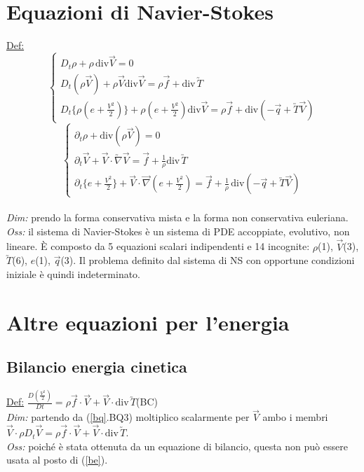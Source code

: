 \documentclass[11pt,a4paper]{report}
\newcommand{\sz}[1]{\scriptsize #1\normalsize}
\begin{document}
	\section{Equazioni di Navier-Stokes}	\label{ns}
	\underline{Def:}$$\begin{cases}
	D_t\rho+\rho\,\mathrm{div}\vec V=0\\
	D_t(\rho\vec V)+\rho\vec V\mathrm{div}\vec V=\rho\vec f+\mathrm{div}\,\utilde T\\
	D_t\{\rho(e+\frac{V^2}{2})\}+\rho(e+\frac{V^2}{2})\mathrm{div}\vec V=\rho\vec f+\mathrm{div}(-\vec q+\utilde T\vec V)
	\end{cases}$$
	$$\begin{cases}
	\partial_t\rho+\mathrm{div}(\rho\vec V)=0\\
	\partial_t\vec V+\vec V\cdot\utilde\nabla\vec V=\vec f+\frac 1\rho\mathrm{div}\,\utilde T\\
	\partial_t\{e+\frac{V^2}{2}\}+\vec V\cdot\vec\nabla(e+\frac{V^2}{2})=\vec f+\frac 1\rho\,\mathrm{div}(-\vec q+\utilde T\vec V)
	\end{cases}$$\\
	\textit{Dim:} prendo la forma conservativa mista e la forma non conservativa euleriana.\\
	\textit{Oss:} il sistema di Navier-Stokes è un sistema di PDE accoppiate, evolutivo, non lineare. È composto da 5 equazioni scalari indipendenti e 14 incognite: $\rho$(1), $\vec V$(3), $\utilde T$(6), $e$(1), $\vec q$(3). Il problema definito dal sistema di NS con opportune condizioni iniziale è quindi indeterminato.
		
	\section{Altre equazioni per l'energia}
		\subsection{Bilancio energia cinetica}	\label{bil en cin}
		\underline{Def:} $\frac{D(\frac{V^2}{2})}{Dt}=\rho\vec f\cdot\vec V+\vec V\cdot\mathrm{div}\,\utilde T$\quad\sz{(BC) }\\
		\textit{Dim:} partendo da (\ref{bq}.\sz{BQ3}) moltiplico scalarmente per $\vec V$ ambo i membri $\vec V\cdot\rho D_t\vec V=\rho\vec f\cdot\vec V+\vec V\cdot\mathrm{div}\,\utilde T$.\\
		\textit{Oss:} poiché è stata ottenuta da un equazione di bilancio, questa non può essere usata al posto di (\ref{be}).
\end{document}
